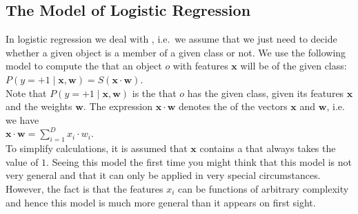 \subsection{The Model of Logistic Regression}
In logistic regression we deal with , i.e.~we assume that we just need to decide
whether a given object is a member of a given class or not.  We use the following model to compute the  that an
object $o$ with features $\mathbf{x}$ will be of the given class: 
\\[0.2cm]
\hspace*{1.3cm}
$P(y=+1\;|\;\mathbf{x},\mathbf{w}) = S(\mathbf{x} \cdot \mathbf{w})$.
\\[0.2cm]
Note that $P(y=+1\;|\;\mathbf{x},\mathbf{w})$ is the  that $o$ has the given
class, given its features $\mathbf{x}$ and the weights $\mathbf{w}$.  The expression $\mathbf{x}
\cdot \mathbf{w}$ denotes the  of the vectors $\mathbf{x}$ and $\mathbf{w}$,  
i.e. we have
\\[0.2cm]
\hspace*{1.3cm}
$\mathbf{x} \cdot \mathbf{w} = \sum\limits_{i=1}^D x_i \cdot w_i$.
\\[0.2cm] 
To simplify calculations, it is assumed that $\mathbf{x}$ contains a  that always takes the value of $1$.
Seeing this model the first time you might think that this model is not very general and that it can only be
applied in very special circumstances.  However, the fact is that the features $x_i$ can be functions of arbitrary complexity
and hence this model is much more general than it appears on first sight.

